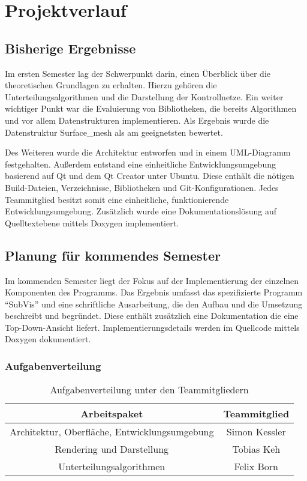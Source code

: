 \chapter{Projektverlauf}

\section{Bisherige Ergebnisse}

Im ersten Semester lag der Schwerpunkt darin, einen Überblick über die theoretischen Grundlagen zu erhalten. 
Hierzu gehören die Unterteilungsalgorithmen und die Darstellung der Kontrollnetze.
Ein weiter wichtiger Punkt war die Evaluierung von Bibliotheken, die bereits Algorithmen und vor allem Datenstrukturen implementieren. 
Als Ergebnis wurde die Datenstruktur Surface\_mesh als am geeignetsten bewertet.

Des Weiteren wurde die Architektur entworfen und in einem UML-Diagramm festgehalten.
Außerdem entstand eine einheitliche Entwicklungsumgebung basierend auf Qt und dem Qt Creator unter Ubuntu.
Diese enthält die nötigen Build-Dateien, Verzeichnisse, Bibliotheken und Git-Konfigurationen.
Jedes Teammitglied besitzt somit eine einheitliche, funktionierende Entwicklungsumgebung.
Zusätzlich wurde eine Dokumentationslösung auf Quelltextebene mittels Doxygen implementiert.

\section{Planung für kommendes Semester}

Im kommenden Semester liegt der Fokus auf der Implementierung der einzelnen Komponenten des Programms.
Das Ergebnis umfasst das spezifizierte Programm \enquote{SubVis} und eine schriftliche Ausarbeitung, die den Aufbau und die Umsetzung beschreibt und begründet.
Diese enthält zusätzlich eine Dokumentation die eine Top-Down-Ansicht liefert. 
Implementierungsdetails werden im Quellcode mittels Doxygen dokumentiert.

\subsection{Aufgabenverteilung}

\begin{table}
\caption{Aufgabenverteilung unter den Teammitgliedern}
\center
\begin{tabular}{c|c}
Arbeitspaket & Teammitglied\\
\hline
Architektur, Oberfläche, Entwicklungsumgebung & Simon Kessler \\
Rendering und Darstellung & Tobias Keh \\
Unterteilungsalgorithmen & Felix Born \\
\end{tabular}
\label{tab:aufgabenverteilung}
\end{table}

